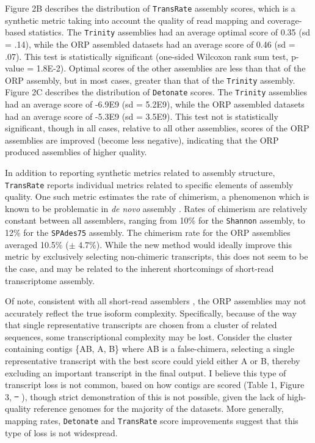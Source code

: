 \documentclass[10pt,letterpaper]{article}
\newcommand{\tit}{\textit}
\providecommand{\DIFaddtex}[1]{{\protect\color{blue}\uwave{#1}}} %
\providecommand{\DIFdeltex}[1]{{\protect\color{red}\sout{#1}}}                      %
\providecommand{\DIFaddbegin}{} %
\providecommand{\DIFaddend}{} %
\providecommand{\DIFdelbegin}{} %
\providecommand{\DIFdelend}{} %
\providecommand{\DIFadd}[1]{\texorpdfstring{\DIFaddtex{#1}}{#1}} %
\providecommand{\DIFdel}[1]{\texorpdfstring{\DIFdeltex{#1}}{}} %
\newcommand{\DIFscaledelfig}{0.5}
\newlength{\DIFdelgraphicswidth} %
\newlength{\DIFdelgraphicsheight} %
\newcommand{\DIFaddincludegraphics}[2][]{{\color{blue}\fbox{\DIFOincludegraphics[#1]{#2}}}} %
\newcommand{\DIFdelincludegraphics}[2][]{%
\sbox{\DIFdelgraphicsbox}{\DIFOincludegraphics[#1]{#2}}%
\settoboxwidth{\DIFdelgraphicswidth}{\DIFdelgraphicsbox} %
\settoboxtotalheight{\DIFdelgraphicsheight}{\DIFdelgraphicsbox} %
\scalebox{\DIFscaledelfig}{%
\parbox[b]{\DIFdelgraphicswidth}{\usebox{\DIFdelgraphicsbox}\\[-\baselineskip] \rule{\DIFdelgraphicswidth}{0em}}\llap{\resizebox{\DIFdelgraphicswidth}{\DIFdelgraphicsheight}{%
\setlength{\unitlength}{\DIFdelgraphicswidth}%
\begin{picture}(1,1)%
\thicklines\linethickness{2pt} %
{\color[rgb]{1,0,0}\put(0,0){\framebox(1,1){}}}%
{\color[rgb]{1,0,0}\put(0,0){\line( 1,1){1}}}%
{\color[rgb]{1,0,0}\put(0,1){\line(1,-1){1}}}%
\end{picture}%
}\hspace*{3pt}}} %
} %
\DeclareRobustCommand{\DIFaddbegin}{\DIFOaddbegin \let\includegraphics\DIFaddincludegraphics} %
\DeclareRobustCommand{\DIFaddend}{\DIFOaddend \let\includegraphics\DIFOincludegraphics} %
\DeclareRobustCommand{\DIFdelbegin}{\DIFOdelbegin \let\includegraphics\DIFdelincludegraphics} %
\DeclareRobustCommand{\DIFdelend}{\DIFOaddend \let\includegraphics\DIFOincludegraphics} %
\begin{document}
Figure 2B describes the distribution of \texttt{TransRate} assembly scores, which is a synthetic metric taking into account the quality of read mapping and coverage-based statistics. The \texttt{Trinity} assemblies had an average optimal score of 0.35 (sd = .14), while the ORP assembled datasets had an average score of 0.46 (sd = .07). This test is statistically significant (one-sided Wilcoxon rank sum test, p-value = 1.8E-2). Optimal scores of the other assemblies are less than that of the ORP assembly, but in most cases, greater than that of the \texttt{Trinity} assembly. Figure 2C describes the distribution of \texttt{Detonate} scores. The \texttt{Trinity} assemblies had an average score of -6.9E9 (sd = 5.2E9), while the ORP assembled datasets had an average score of -5.3E9 (sd = 3.5E9). This test not is statistically significant, though in all cases, relative to all other assemblies, scores of the ORP assemblies are improved (become less negative), indicating that the ORP produced assemblies of higher quality. 

In addition to reporting synthetic metrics related to assembly structure, \texttt{TransRate} reports individual metrics related to specific elements of assembly quality. One such metric estimates the rate of chimerism, a phenomenon which is known to be problematic in \tit{de novo} assembly \citep{Ungaro:2017kf, Singhal:2013dq}. Rates of chimerism are relatively constant between all assemblers, ranging from 10\% for the \texttt{Shannon} assembly, to 12\% for the \texttt{SPAdes75} assembly. The chimerism rate for the ORP assemblies averaged 10.5\% ($\pm$ 4.7\%). While the new method would ideally improve this metric by exclusively selecting non-chimeric transcripts, this does not seem to be the case, and may be related to the inherent shortcomings of short-read transcriptome assembly.

Of note, consistent with all short-read assemblers \citep{Ungaro:2017kf}, the ORP assemblies may not accurately reflect the true isoform complexity. Specifically, because of the way that single representative transcripts are chosen from a cluster of related sequences, some transcriptional complexity may be lost. Consider the cluster containing contigs \{AB, A, B\} where AB is a false-chimera, selecting a single representative transcript with the best score could yield either A or B, thereby excluding an important transcript in the final output. I believe this type of transcript loss is not common, based on how contigs are scored (Table 1, Figure 3, \DIFdelbegin \DIFdel{\mbox{%
\cite{SmithUnna:2016go}}%
}\DIFdelend \DIFaddbegin \DIFadd{\mbox{%
\citep{SmithUnna:2016go}}%
}\DIFaddend ), though strict demonstration of this is not possible, given the lack of high-quality reference genomes for the majority of the datasets. More generally, mapping rates, \texttt{Detonate} and \texttt{TransRate} score improvements suggest that this type of loss is not widespread.
\end{document}
